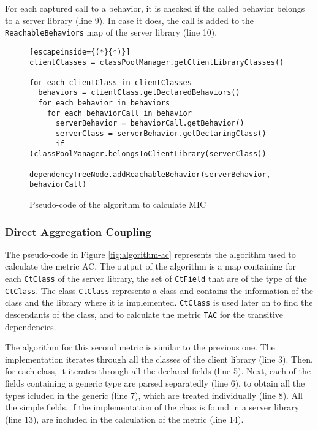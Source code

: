 For each captured call to a behavior, it is checked if the called behavior belongs to a server library (line 9). In case it does, the call is added to the \texttt{ReachableBehaviors} map of the server library (line 10).

\begin{figure}[ht!]
\begin{lstlisting}[escapeinside={(*}{*)}]
clientClasses = classPoolManager.getClientLibraryClasses()

for each clientClass in clientClasses
  behaviors = clientClass.getDeclaredBehaviors()
  for each behavior in behaviors
    for each behaviorCall in behavior
      serverBehavior = behaviorCall.getBehavior()
      serverClass = serverBehavior.getDeclaringClass()
      if (classPoolManager.belongsToClientLibrary(serverClass))
        dependencyTreeNode.addReachableBehavior(serverBehavior, behaviorCall)
\end{lstlisting}
\caption{Pseudo-code of the algorithm to calculate MIC}
\label{fig:algorithm-mic}
\end{figure}

\subsubsection{Direct Aggregation Coupling}
The pseudo-code in Figure \ref{fig:algorithm-ac} represents the algorithm used to calculate the metric AC. The output of the algorithm is a map containing for each \texttt{CtClass} of the server library, the set of \texttt{CtField} that are of the type of the \texttt{CtClass}. The class \texttt{CtClass} represents a class and contains the information of the class and the library where it is implemented. \texttt{CtClass} is used later on to find the descendants of the class, and to calculate the metric \texttt{TAC} for the transitive dependencies.

The algorithm for this second metric is similar to the previous one. The implementation iterates through all the classes of the client library (line 3). Then, for each class, it iterates through all the declared fields (line 5). Next, each of the fields containing a generic type are parsed separatedly (line 6), to obtain all the types icluded in the generic  (line 7), which are treated individually (line 8). All the simple fields, if the implementation of the class is found in a server library (line 13), are included in the calculation of the metric (line 14).

